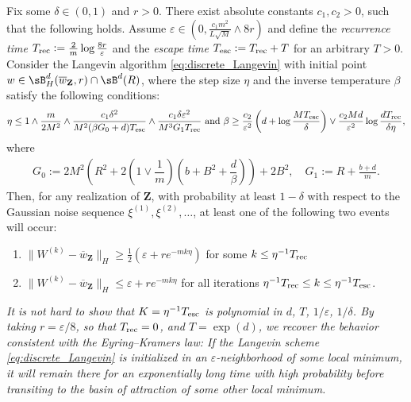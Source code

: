 \documentclass[final,12pt]{colt2018}
\numberwithin{equation}{section}
\numberwithin{equation}{section}
\def\deq{:=}
\def\bd#1{\mathbf{#1}}
\def\bZ{\bd{Z}}
\def\barw{\overline{w}}
\def\eps{\varepsilon}
\begin{document}
	
		\begin{theorem}\label{thm:emp_metastable} Fix some $\delta \in (0,1)$ and $r > 0$. There exist absolute constants $c_1,c_2 > 0$, such that the following holds. Assume $\eps \in (0,\frac{c_1m^2}{L\sqrt{M}} \wedge 8r)$ and define the {\em recurrence time} $T_{\rm rec} \deq \frac{2}{m}\log \frac{8r}{\eps}$ and the {\em escape time} $T_{\rm esc} \deq T_{\rm rec} + T$ for an arbitrary $T > 0$. Consider the Langevin algorithm \eqref{eq:discrete_Langevin} with initial point $w \in \sB^d_H(\barw_\bZ,r) \cap \sB^d(R)$, where the step size $\eta$ and the inverse temperature $\beta$ satisfy the following conditions:
\begin{align*}
\eta \le 1 \wedge \dfrac{m}{2M^2} \wedge \dfrac{c_1\delta^2}{M^2(\beta G_0+d)T_{\rm esc}} \wedge \dfrac{c_1 \delta\eps^2}{M^3 G_1 T_{\rm rec}} \text{ and } \beta \ge \dfrac{c_2}{\eps^2}\left(d + \log \dfrac{MT_{\rm esc}}{\delta}\right) \vee \dfrac{c_2Md}{\eps^2}\log \dfrac{dT_{\rm rec}}{\delta \eta},
\end{align*}
where 
			 \begin{align}\label{eq:grad_bound}
				 G_0 := 2M^2 \left( R^2 + 2\left(1 \vee \dfrac{1}{m}\right) \left(b+B^2+\dfrac{d}{\beta}\right) \right) + 2B^2, \quad G_1 \deq R + \frac{b+d}{m}.
			\end{align}
			Then, for any realization of $\bZ$, with probability at least $1-\delta$ with respect to the Gaussian noise sequence $\xi^{(1)},\xi^{(2)},\ldots$, at least one of the following two events will occur:
			\begin{enumerate}
				\item $\|W^{(k)} - \barw_\bZ\|_H \ge \frac{1}{2}\left(\eps + re^{-mk\eta}\right)$ for some $k \le \eta^{-1}T_{\rm rec}$
				\item $\|W^{(k)} - \barw_\bZ\|_H \le \eps + re^{-mk\eta}$ for all iterations $\eta^{-1}T_{\rm rec} \le k \le \eta^{-1}T_{\rm esc}$.
			\end{enumerate}
    \end{theorem}
	
\begin{remark} {\em It is not hard to show that $K = \eta^{-1}T_{\rm esc}$ is polynomial in $d$, $T$, $1/\eps$, $1/\delta$. By taking $r = \eps/8$, so that $T_{\rm rec} = 0$, and $T = \exp(d)$, we recover the behavior consistent with the Eyring--Kramers law: If the Langevin scheme \eqref{eq:discrete_Langevin} is initialized in an $\eps$-neighborhood of some local minimum, it will remain there for an exponentially long time with high probability before transiting to the basin of attraction of some other local minimum.}
\end{remark}
\end{document}
